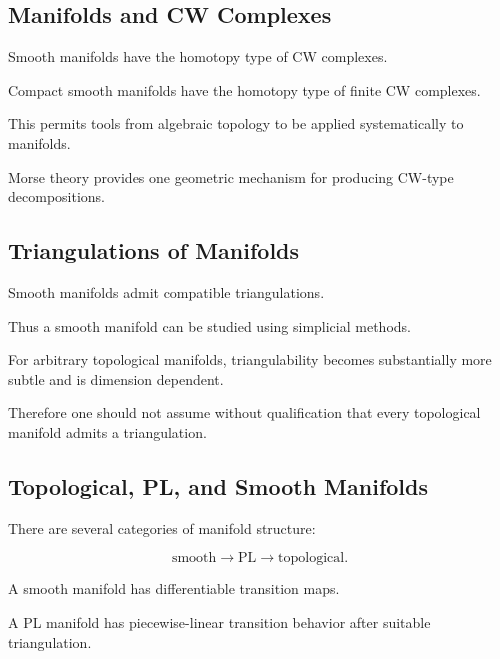 \subsection{Manifolds and CW Complexes}
\label{subsec:manifolds-cw-complexes}

Smooth manifolds have the homotopy type of CW complexes.

Compact smooth manifolds have the homotopy type of finite CW complexes.

This permits tools from algebraic topology to be applied systematically to
manifolds.

Morse theory provides one geometric mechanism for producing CW-type
decompositions.

\subsection{Triangulations of Manifolds}
\label{subsec:triangulations-manifolds}

Smooth manifolds admit compatible triangulations.

Thus a smooth manifold can be studied using simplicial methods.

For arbitrary topological manifolds, triangulability becomes substantially
more subtle and is dimension dependent.

Therefore one should not assume without qualification that every
topological manifold admits a triangulation.

\subsection{Topological, PL, and Smooth Manifolds}
\label{subsec:topological-pl-smooth-manifolds}

There are several categories of manifold structure:

\[
\boxed{
\text{smooth}
\longrightarrow
\mathrm{PL}
\longrightarrow
\text{topological}.
}
\]

A smooth manifold has differentiable transition maps.

A PL manifold has piecewise-linear transition behavior after suitable
triangulation.

